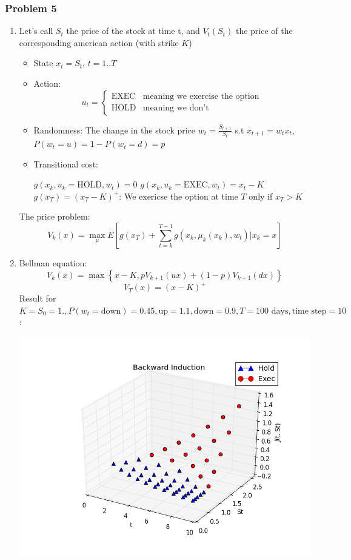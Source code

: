 \documentclass[12pt]{article}
\newcommand{\Q}[1]{\subsubsection*{Problem #1}}
\begin{document}
\Q{5}
\begin{enumerate}
\item Let's call $S_t$ the price of the stock at time t, and $V_t(S_t)$ the
  price of the corresponding american action (with strike $K$)
  \begin{itemize}
  \item State $x_t = S_t$, $t = 1..T$
  \item Action:
    \[
      u_t = \left\{ \begin{array}{cc}
                      \text{EXEC} & \text{meaning we exercise the option}\\
                      \text{HOLD} & \text{meaning we don't}
                    \end{array}
                  \right.
                \]
              \item Randomness: The change in the stock price
                $w_t = \frac{S_{t+1}}{S_t}$ s.t $x_{t+1} = w_t x_t$, $P(w_t = u) = 1 - P(w_t = d) = p$
              \item Transitional cost:
  
                $g(x_k, u_k=\text{HOLD}, w_t) = 0$
                $g(x_k, u_k=\text{EXEC}, w_t) = x_t-K$
                $g(x_T) = (x_T - K)^+$: We exericse the option at time $T$ only if $x_T > K$
              \end{itemize}
              The price problem:
  $$V_k(x) = \max_{\mu} E[g(x_T) + \sum_{t=k}^{T-1} g(x_k, \mu_k(x_k), w_t) | x_k = x]$$

\item Bellman equation:
  $$V_k(x) = \max \left\{ x-K , p V_{k+1}(u x) + (1-p) V_{k+1}(d x) \right\}$$
  $$V_T(x) = (x-K)^+$$
  Result for $K = S_0 = 1., P(w_t = \text{down}) = 0.45, \text{up} = 1.1, \text{down} = 0.9, T = 100 \text{ days}, \text{time step} = 10$:
 
  \includegraphics[scale=1.]{qtree.png}


\end{enumerate}
\end{document}
